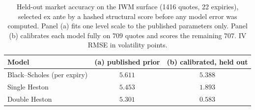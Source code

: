 \begin{table}[t]
\centering
\caption{Held-out market accuracy on the IWM surface (1416 quotes, 22
expiries), selected ex ante by a hashed structural score before any model error
was computed. Panel (a) fits one level scale to the published parameters only.
Panel (b) calibrates each model fully on $709$ quotes and scores the remaining
$707$. IV RMSE in volatility points.}
\label{tab:market}
\begin{tabular}{lcc}
\toprule
Model & (a) published prior & (b) calibrated, held out \\
\midrule
Black--Scholes (per expiry) & $5.611$ & $5.388$ \\
Single Heston               & $5.453$ & $1.893$ \\
Double Heston               & $\mathbf{5.301}$ & $\mathbf{0.583}$ \\
\bottomrule
\end{tabular}
\end{table}
